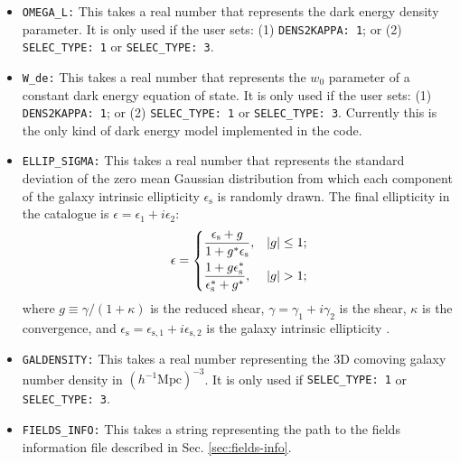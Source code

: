 \documentclass[12pt]{book} %
\newcommand{\nv}[1]{\mathrm{#1}}                 %
\begin{document}
\begin{itemize}
\item {\tt OMEGA\_L:} This takes a real number that represents the dark energy density parameter. 
  It is only used if the user sets: (1) {\tt DENS2KAPPA: 1}; or (2) {\tt SELEC\_TYPE: 1} or {\tt SELEC\_TYPE: 3}. 

\item {\tt W\_de:} This takes a real number that represents the $w_0$ parameter of a constant dark energy 
  equation of state. It is only used if the user sets: (1) {\tt DENS2KAPPA: 1}; or (2) {\tt SELEC\_TYPE: 1} 
  or {\tt SELEC\_TYPE: 3}. Currently this is the only kind of dark energy model implemented in the code. 

\item {\tt ELLIP\_SIGMA:} This takes a real number that represents the standard deviation of the zero mean 
  Gaussian distribution from which each component of the galaxy intrinsic ellipticity $\epsilon_{\nv{s}}$ 
  is randomly drawn. The final ellipticity in the catalogue is $\epsilon=\epsilon_1+i\epsilon_2$:
  \begin{equation}
    \epsilon = 
    \begin{dcases}
      \frac{\epsilon_{\nv{s}}+g}{1+g^{*}\epsilon_{\nv{s}}}, & |g|\leq 1; \\
      \frac{1+g\epsilon_{\nv{s}}^{*}}{\epsilon_{\nv{s}}^{*}+g^{*}}, & |g|>1;\\
    \end{dcases}
    \label{eq:ellipticity}
  \end{equation}
  where $g\equiv \gamma/(1+\kappa)$ is the reduced shear, $\gamma=\gamma_1+i\gamma_2$ is the shear, $\kappa$ is the 
  convergence, and $\epsilon_{\nv{s}}=\epsilon_{\nv{s},1}+i\epsilon_{\nv{s},2}$ is the galaxy intrinsic 
  ellipticity \citep[we follow ][eq. 4.12]{Bartelmann01mn}.
  
\item {\tt GALDENSITY:} This takes a real number representing the 3D comoving galaxy number 
  density in $(h^{-1}\nv{Mpc})^{-3}$. It is only used if {\tt SELEC\_TYPE: 1} or {\tt SELEC\_TYPE: 3}. 

\item {\tt FIELDS\_INFO:} This takes a string representing the path to the fields information file 
  described in Sec. \ref{sec:fields-info}.


\end{itemize}
\end{document}
